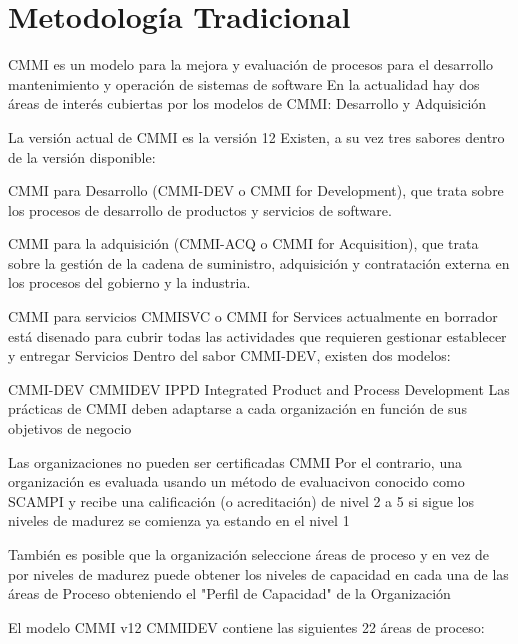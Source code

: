 \section{Metodolog\'ia Tradicional}


 CMMI  es un modelo para la mejora y evaluaci\'on de procesos para el desarrollo mantenimiento y operaci\'on de sistemas de software En la actualidad hay dos \'areas de inter\'es cubiertas por los modelos de CMMI: Desarrollo y Adquisici\'on
 

La versi\'on actual de CMMI es la versi\'on 12 Existen, a su vez tres sabores dentro de la versi\'on disponible:


CMMI para Desarrollo (CMMI-DEV o CMMI for Development), que trata  sobre los procesos de desarrollo de productos y servicios de software.

CMMI para la adquisici\'on (CMMI-ACQ o CMMI for Acquisition), que trata sobre la gesti\'on de la cadena de suministro, adquisici\'on y contrataci\'on externa en los procesos del gobierno y la industria.

CMMI para servicios CMMISVC o CMMI for Services actualmente en borrador est\'a disenado para cubrir todas las actividades que requieren gestionar establecer y entregar Servicios
Dentro del sabor CMMI-DEV, existen dos modelos:

CMMI-DEV CMMIDEV IPPD Integrated Product and Process Development
Las pr\'acticas de CMMI deben adaptarse a cada organizaci\'on en funci\'on de sus objetivos de negocio

Las organizaciones no pueden ser certificadas CMMI Por el contrario, una organizaci\'on es evaluada usando un m\'etodo de evaluacivon conocido como SCAMPI y recibe una calificaci\'on (o acreditaci\'on) de nivel 2 a 5 si sigue los niveles de madurez se comienza ya estando en el nivel 1

Tambi\'en es posible que la organizaci\'on seleccione \'areas de proceso y en vez de por niveles de madurez puede obtener los niveles de capacidad en cada una de las \'areas de Proceso obteniendo el "Perfil de Capacidad" de la Organizaci\'on

El modelo CMMI v12 CMMIDEV contiene las siguientes 22 \'areas de proceso:


